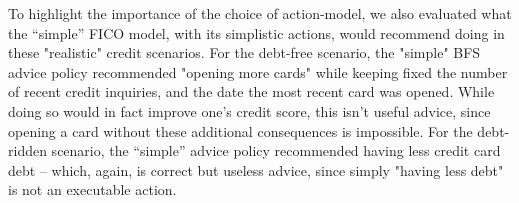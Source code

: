 To highlight the importance of the choice of action-model, we also evaluated what the ``simple'' FICO model, with its simplistic actions, would recommend doing in these "realistic" credit scenarios. For the debt-free scenario, the "simple" BFS advice policy recommended "opening more cards" while keeping fixed the number of recent credit inquiries, and the date the most recent card was opened. While doing so would in fact improve one's credit score, this isn't useful advice, since opening a card without these additional consequences is impossible. For the debt-ridden scenario, the ``simple'' advice policy recommended having less credit card debt -- which, again, is correct but useless advice, since simply "having less debt" is not an executable action.





